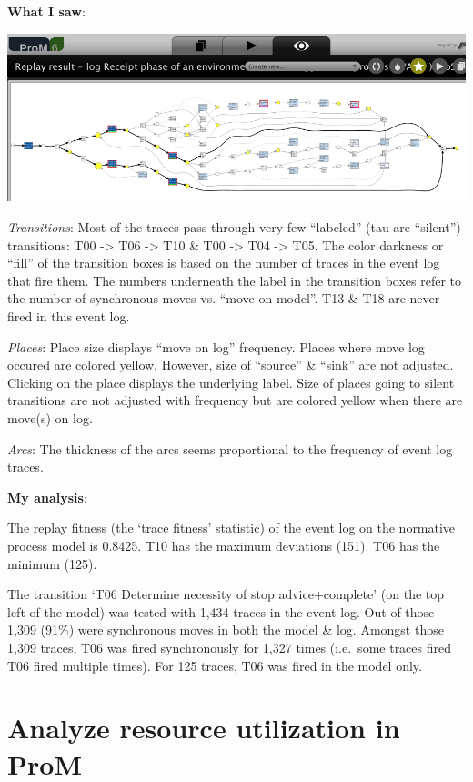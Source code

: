 \documentclass[]{article}
\begin{document}
\textbf{What I saw}:

\includegraphics{CoSeLoG_Step_06_PetriNet_Normative_Conformance.png}

\emph{Transitions}: Most of the traces pass through very few ``labeled''
(tau are ``silent'') transitions: T00 -\textgreater{} T06
-\textgreater{} T10 \& T00 -\textgreater{} T04 -\textgreater{} T05. The
color darkness or ``fill'' of the transition boxes is based on the
number of traces in the event log that fire them. The numbers underneath
the label in the transition boxes refer to the number of synchronous
moves vs. ``move on model''. T13 \& T18 are never fired in this event
log.

\emph{Places}: Place size displays ``move on log'' frequency. Places
where move log occured are colored yellow. However, size of ``source''
\& ``sink'' are not adjusted. Clicking on the place displays the
underlying label. Size of places going to silent transitions are not
adjusted with frequency but are colored yellow when there are move(s) on
log.

\emph{Arcs}: The thickness of the arcs seems proportional to the
frequency of event log traces.

\textbf{My analysis}:

The replay fitness (the `trace fitness' statistic) of the event log on
the normative process model is 0.8425. T10 has the maximum deviations
(151). T06 has the minimum (125).

The transition `T06 Determine necessity of stop advice+complete' (on the
top left of the model) was tested with 1,434 traces in the event log.
Out of those 1,309 (91\%) were synchronous moves in both the model \&
log. Amongst those 1,309 traces, T06 was fired synchronously for 1,327
times (i.e.~some traces fired T06 fired multiple times). For 125 traces,
T06 was fired in the model only.

\section{Analyze resource utilization in
ProM}\label{analyze-resource-utilization-in-prom}
\end{document}
